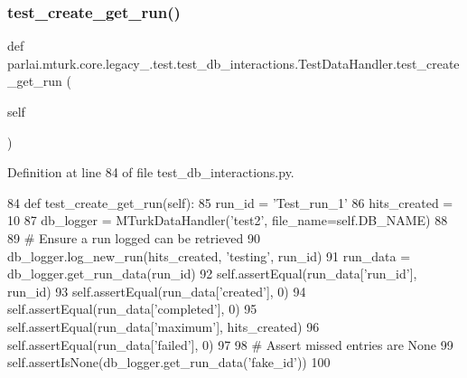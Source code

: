 \subsubsection{\texorpdfstring{test\+\_\+create\+\_\+get\+\_\+run()}{test\_create\_get\_run()}}
{\footnotesize\ttfamily def parlai.\+mturk.\+core.\+legacy\+\_.\+test.\+test\+\_\+db\+\_\+interactions.\+Test\+Data\+Handler.\+test\+\_\+create\+\_\+get\+\_\+run (\begin{DoxyParamCaption}\item[{}]{self }\end{DoxyParamCaption})}



Definition at line 84 of file test\+\_\+db\+\_\+interactions.\+py.


\begin{DoxyCode}
84     \textcolor{keyword}{def }test\_create\_get\_run(self):
85         run\_id = \textcolor{stringliteral}{'Test\_run\_1'}
86         hits\_created = 10
87         db\_logger = MTurkDataHandler(\textcolor{stringliteral}{'test2'}, file\_name=self.DB\_NAME)
88 
89         \textcolor{comment}{# Ensure a run logged can be retrieved}
90         db\_logger.log\_new\_run(hits\_created, \textcolor{stringliteral}{'testing'}, run\_id)
91         run\_data = db\_logger.get\_run\_data(run\_id)
92         self.assertEqual(run\_data[\textcolor{stringliteral}{'run\_id'}], run\_id)
93         self.assertEqual(run\_data[\textcolor{stringliteral}{'created'}], 0)
94         self.assertEqual(run\_data[\textcolor{stringliteral}{'completed'}], 0)
95         self.assertEqual(run\_data[\textcolor{stringliteral}{'maximum'}], hits\_created)
96         self.assertEqual(run\_data[\textcolor{stringliteral}{'failed'}], 0)
97 
98         \textcolor{comment}{# Assert missed entries are None}
99         self.assertIsNone(db\_logger.get\_run\_data(\textcolor{stringliteral}{'fake\_id'}))
100 
\end{DoxyCode}
\mbox{\label{classparlai_1_1mturk_1_1core_1_1legacy__2018_1_1test_1_1test__db__interactions_1_1TestDataHandler_a93e30b36f98cdee7239ad00e79db7354}} 
